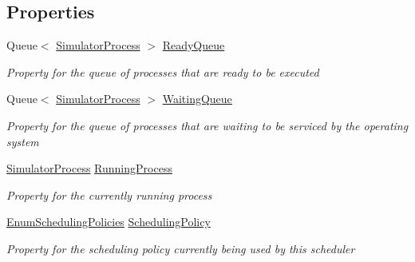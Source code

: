 \subsection*{Properties}
\begin{DoxyCompactItemize}
\item 
Queue$<$ \hyperlink{class_c_p_u___o_s___simulator_1_1_operating___system_1_1_simulator_process}{Simulator\+Process} $>$ \hyperlink{class_c_p_u___o_s___simulator_1_1_operating___system_1_1_scheduler_a7f0cc5668527496de0028013dae3be0c}{Ready\+Queue}
\begin{DoxyCompactList}\small\item\em Property for the queue of processes that are ready to be executed \end{DoxyCompactList}\item 
Queue$<$ \hyperlink{class_c_p_u___o_s___simulator_1_1_operating___system_1_1_simulator_process}{Simulator\+Process} $>$ \hyperlink{class_c_p_u___o_s___simulator_1_1_operating___system_1_1_scheduler_aac41827d1eff5710d0a9b5ea664dd99f}{Waiting\+Queue}
\begin{DoxyCompactList}\small\item\em Property for the queue of processes that are waiting to be serviced by the operating system \end{DoxyCompactList}\item 
\hyperlink{class_c_p_u___o_s___simulator_1_1_operating___system_1_1_simulator_process}{Simulator\+Process} \hyperlink{class_c_p_u___o_s___simulator_1_1_operating___system_1_1_scheduler_a6de759cc7e75011ef51456dd95104a95}{Running\+Process}
\begin{DoxyCompactList}\small\item\em Property for the currently running process \end{DoxyCompactList}\item 
\hyperlink{namespace_c_p_u___o_s___simulator_1_1_operating___system_ad0cdaacf9652394d23fa29109640fe08}{Enum\+Scheduling\+Policies} \hyperlink{class_c_p_u___o_s___simulator_1_1_operating___system_1_1_scheduler_afbf291846705747709c32eb79f1106b4}{Scheduling\+Policy}
\begin{DoxyCompactList}\small\item\em Property for the scheduling policy currently being used by this scheduler \end{DoxyCompactList}\item 

\end{DoxyCompactItemize}
